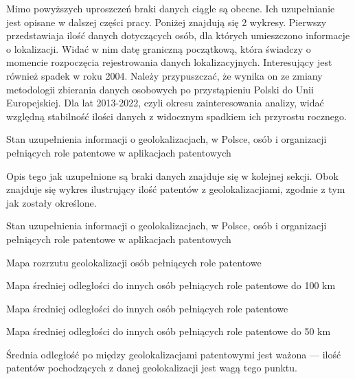 Mimo powyższych uproszczeń braki danych ciągle są obecne. Ich uzupełnianie
jest opisane w dalszej części pracy. Poniżej znajdują się 2 wykresy. 
Pierwszy przedstawiaja ilość danych dotyczących osób, dla których 
umieszczono informacje o lokalizacji. Widać w nim datę graniczną początkową,
która świadczy o momencie rozpoczęcia rejestrowania danych lokalizacyjnych.
Interesujący jest również spadek w roku 2004. Należy przypuszczać, że wynika
on ze zmiany metodologii zbierania danych osobowych po przystąpieniu
Polski do Unii Europejskiej.
Dla lat 2013-2022, czyli okresu zainteresowania analizy,
widać względną stabilność ilości danych z widocznym
spadkiem ich przyrostu rocznego. 



{ Stan uzupełnienia informacji
  o geolokalizacjach,
  w Polsce,
  osób i organizacji 
  pełniących role patentowe 
  w aplikacjach patentowych}


\newpage
\begin{multicols}{2}

Opis tego jak uzupełnione są braki danych znajduje się w kolejnej sekcji.
Obok znajduje się wykres ilustrujący ilość patentów z geolokalizacjiami,
zgodnie z tym jak zostały określone.

{ Stan uzupełnienia informacji o geolokalizacjach, w Polsce, 
  osób i organizacji  pełniących role patentowe
  w aplikacjach patentowych}

\end{multicols}

\newpage
\begin{multicols}{2}

{Mapa rozrzutu geolokalizacji osób pełniących role patentowe}

{Mapa średniej odległości do innych osób pełniących role patentowe do 100 km}

\columnbreak

{Mapa średniej odległości do innych osób pełniących role patentowe}

{Mapa średniej odległości do innych osób pełniących role patentowe do 50 km}

\end{multicols}

\begin{multicols}{2}


\begin{uwaga}
Średnia odległość po między geolokalizacjami patentowymi jest ważona ---
ilość patentów pochodzących z danej geolokalizacji jest wagą tego punktu.
\end{uwaga}

\end{multicols}

